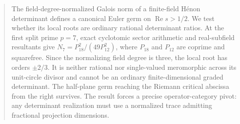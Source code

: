 \begin{abstract}
The field-degree-normalized Galois norm of a finite-field H\'enon determinant
defines a canonical Euler germ on $\operatorname{Re}s>1/2$.  We test whether
its local roots are ordinary rational determinant ratios.  At the first split
prime $p=7$, exact cyclotomic sector arithmetic and real-subfield resultants
give $N_7=P_{18}^2/(49P_{12}^2)$, where $P_{18}$ and $P_{12}$ are coprime and
squarefree.  Since the normalizing field degree is three, the local root has
orders $\pm2/3$.  It is neither rational nor single-valued meromorphic across
its unit-circle divisor and cannot be an ordinary finite-dimensional graded
determinant.  The half-plane germ reaching the Riemann critical abscissa from
the right survives.  The result forces a precise operator-category pivot: any
determinant realization must use a normalized trace admitting fractional
projection dimensions.
\end{abstract}
